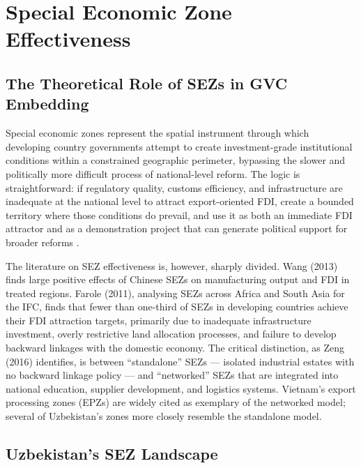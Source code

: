 \section{Special Economic Zone Effectiveness}
\label{sec:sez}

\subsection{The Theoretical Role of SEZs in GVC Embedding}

Special economic zones represent the spatial instrument through which developing country governments attempt to create investment-grade institutional conditions within a constrained geographic perimeter, bypassing the slower and politically more difficult process of national-level reform. The logic is straightforward: if regulatory quality, customs efficiency, and infrastructure are inadequate at the national level to attract export-oriented FDI, create a bounded territory where those conditions do prevail, and use it as both an immediate FDI attractor and as a demonstration project that can generate political support for broader reforms \citep{farole2011}.

The literature on SEZ effectiveness is, however, sharply divided. Wang (2013) finds large positive effects of Chinese SEZs on manufacturing output and FDI in treated regions. Farole (2011), analysing SEZs across Africa and South Asia for the IFC, finds that fewer than one-third of SEZs in developing countries achieve their FDI attraction targets, primarily due to inadequate infrastructure investment, overly restrictive land allocation processes, and failure to develop backward linkages with the domestic economy. The critical distinction, as Zeng (2016) identifies, is between ``standalone'' SEZs --- isolated industrial estates with no backward linkage policy --- and ``networked'' SEZs that are integrated into national education, supplier development, and logistics systems. Vietnam's export processing zones (EPZs) are widely cited as exemplary of the networked model; several of Uzbekistan's zones more closely resemble the standalone model.

\subsection{Uzbekistan's SEZ Landscape}

